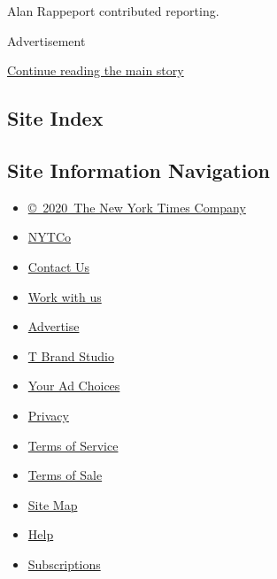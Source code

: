 Alan Rappeport contributed reporting.

Advertisement

\protect\hyperlink{after-bottom}{Continue reading the main story}

\hypertarget{site-index}{%
\subsection{Site Index}\label{site-index}}

\hypertarget{site-information-navigation}{%
\subsection{Site Information
Navigation}\label{site-information-navigation}}

\begin{itemize}
\tightlist
\item
  \href{https://help.nytimes.com/hc/en-us/articles/115014792127-Copyright-notice}{©~2020~The
  New York Times Company}
\end{itemize}

\begin{itemize}
\tightlist
\item
  \href{https://www.nytco.com/}{NYTCo}
\item
  \href{https://help.nytimes.com/hc/en-us/articles/115015385887-Contact-Us}{Contact
  Us}
\item
  \href{https://www.nytco.com/careers/}{Work with us}
\item
  \href{https://nytmediakit.com/}{Advertise}
\item
  \href{http://www.tbrandstudio.com/}{T Brand Studio}
\item
  \href{https://www.nytimes.com/privacy/cookie-policy\#how-do-i-manage-trackers}{Your
  Ad Choices}
\item
  \href{https://www.nytimes.com/privacy}{Privacy}
\item
  \href{https://help.nytimes.com/hc/en-us/articles/115014893428-Terms-of-service}{Terms
  of Service}
\item
  \href{https://help.nytimes.com/hc/en-us/articles/115014893968-Terms-of-sale}{Terms
  of Sale}
\item
  \href{https://spiderbites.nytimes.com}{Site Map}
\item
  \href{https://help.nytimes.com/hc/en-us}{Help}
\item
  \href{https://www.nytimes.com/subscription?campaignId=37WXW}{Subscriptions}
\end{itemize}
